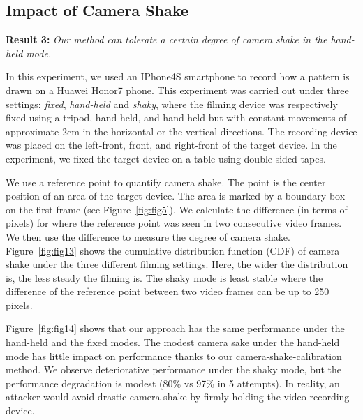     \subsection{Impact of Camera Shake}

    \noindent \textbf{Result 3:} \emph{Our method can tolerate a certain degree of camera shake in the hand-held mode.}

    In this experiment, we used an IPhone4S smartphone to record how a pattern is drawn on a Huawei Honor7 phone. This experiment was carried out under three settings:
    \emph{fixed}, \emph{hand-held} and \emph{shaky}, where the filming
    device was respectively fixed using a tripod, hand-held, and hand-held but with constant movements of
     approximate 2cm in the horizontal or the vertical directions. The recording device was placed on the left-front, front, and right-front of the target device.
    In the experiment, we fixed the target device on a table using double-sided tapes.

    We use a reference point to quantify camera shake. The point
    is the center position of an area of the target device. The area is marked by a boundary box on the first
    frame (see Figure~\ref{fig:fig5}). We calculate the difference (in terms of pixels) for where the
    reference point was seen in two consecutive video frames. We then use the difference to measure the degree of camera shake.
    Figure~\ref{fig:fig13} shows the cumulative distribution function (CDF)
    of camera shake under the three different filming settings.
    Here, the wider the distribution is, the less steady the
     filming is. The shaky mode is least stable where the difference of the reference point between two video frames can be up to 250 pixels.


    Figure~\ref{fig:fig14} shows that our approach has the same performance under
    the hand-held and the fixed modes. The modest camera sake under the hand-held mode
    has little impact on performance thanks to our camera-shake-calibration method. We observe deteriorative performance
    under the shaky mode, but the performance degradation is modest (80\% vs 97\%
    in 5 attempts). In reality, an attacker would avoid drastic
    camera shake by firmly holding the video recording device.

